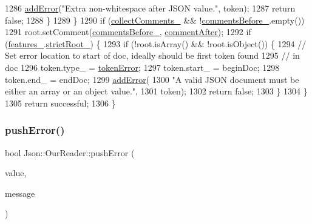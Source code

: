 \begin{DoxyCode}
1286       \hyperlink{class_json_1_1_our_reader_aa6a920311e6408ff3a45324d49da18a6}{addError}(\textcolor{stringliteral}{"Extra non-whitespace after JSON value."}, token);
1287       \textcolor{keywordflow}{return} \textcolor{keyword}{false};
1288     \}
1289   \}
1290   \textcolor{keywordflow}{if} (\hyperlink{class_json_1_1_our_reader_a259f6ac988da2894bcafc670e42f73ad}{collectComments\_} && !\hyperlink{class_json_1_1_our_reader_a9c53e77e290eb9081298210a955fda6a}{commentsBefore\_}.empty())
1291     root.setComment(\hyperlink{class_json_1_1_our_reader_a9c53e77e290eb9081298210a955fda6a}{commentsBefore\_}, \hyperlink{namespace_json_a4fc417c23905b2ae9e2c47d197a45351ac5784ca53b12250888ddb642b06aebef}{commentAfter});
1292   \textcolor{keywordflow}{if} (\hyperlink{class_json_1_1_our_reader_a2714302d5cc54ca2ce4118ea51c0397a}{features\_}.\hyperlink{class_json_1_1_our_features_a2095f66a776c0a4ae6cc931a0c94242e}{strictRoot\_}) \{
1293     \textcolor{keywordflow}{if} (!root.isArray() && !root.isObject()) \{
1294       \textcolor{comment}{// Set error location to start of doc, ideally should be first token found}
1295       \textcolor{comment}{// in doc}
1296       token.type\_ = \hyperlink{class_json_1_1_our_reader_a15116f7276ddf1e7a2cc3cbefa884dccad39f929b971de8dc55fe84a2d2e3465e}{tokenError};
1297       token.start\_ = beginDoc;
1298       token.end\_ = endDoc;
1299       \hyperlink{class_json_1_1_our_reader_aa6a920311e6408ff3a45324d49da18a6}{addError}(
1300           \textcolor{stringliteral}{"A valid JSON document must be either an array or an object value."},
1301           token);
1302       \textcolor{keywordflow}{return} \textcolor{keyword}{false};
1303     \}
1304   \}
1305   \textcolor{keywordflow}{return} successful;
1306 \}
\end{DoxyCode}
\mbox{\label{class_json_1_1_our_reader_a700e9d8e0977fa7e0375d26690d7025f}} 
\subsubsection{\texorpdfstring{push\+Error()}{pushError()}\hspace{0.1cm}{\footnotesize\ttfamily [1/2]}}
{\footnotesize\ttfamily bool Json\+::\+Our\+Reader\+::push\+Error (\begin{DoxyParamCaption}\item[{const \hyperlink{class_json_1_1_value}{Value} \&}]{value,  }\item[{const \hyperlink{json_8h_a1e723f95759de062585bc4a8fd3fa4be}{J\+S\+O\+N\+C\+P\+P\+\_\+\+S\+T\+R\+I\+NG} \&}]{message }\end{DoxyParamCaption})}



